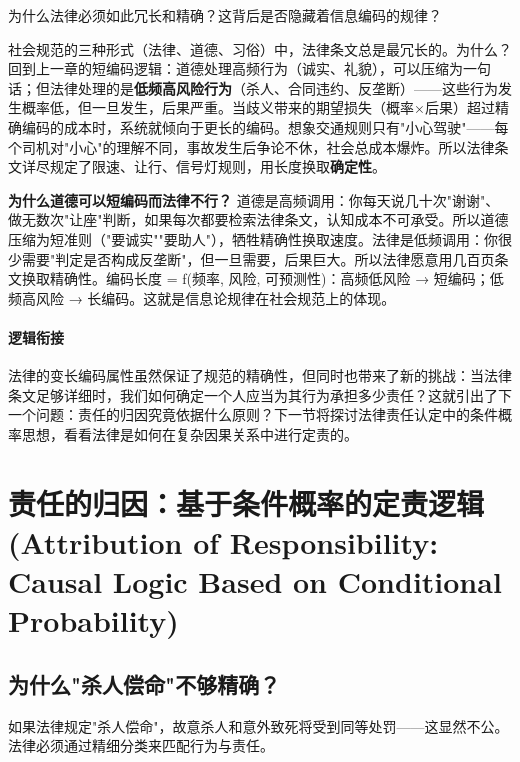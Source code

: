 \documentclass[../main.tex]{subfiles}
\begin{document}
	\begin{questionbox}

		为什么法律必须如此冗长和精确？这背后是否隐藏着信息编码的规律？

	\end{questionbox}
	
	社会规范的三种形式（法律、道德、习俗）中，法律条文总是最冗长的。为什么？回到上一章的短编码逻辑：道德处理高频行为（诚实、礼貌），可以压缩为一句话；但法律处理的是\textbf{低频高风险行为}（杀人、合同违约、反垄断）——这些行为发生概率低，但一旦发生，后果严重。当歧义带来的期望损失（概率×后果）超过精确编码的成本时，系统就倾向于更长的编码。想象交通规则只有"小心驾驶"——每个司机对"小心"的理解不同，事故发生后争论不休，社会总成本爆炸。所以法律条文详尽规定了限速、让行、信号灯规则，用长度换取\textbf{确定性}。
	
	\textbf{为什么道德可以短编码而法律不行？} 道德是高频调用：你每天说几十次"谢谢"、做无数次"让座"判断，如果每次都要检索法律条文，认知成本不可承受。所以道德压缩为短准则（"要诚实""要助人"），牺牲精确性换取速度。法律是低频调用：你很少需要"判定是否构成反垄断"，但一旦需要，后果巨大。所以法律愿意用几百页条文换取精确性。编码长度 = f(频率, 风险, 可预测性)：高频低风险 → 短编码；低频高风险 → 长编码。这就是信息论规律在社会规范上的体现。
	
	\paragraph*{逻辑衔接}

	法律的变长编码属性虽然保证了规范的精确性，但同时也带来了新的挑战：当法律条文足够详细时，我们如何确定一个人应当为其行为承担多少责任？这就引出了下一个问题：责任的归因究竟依据什么原则？下一节将探讨法律责任认定中的条件概率思想，看看法律是如何在复杂因果关系中进行定责的。

	\section{责任的归因：基于条件概率的定责逻辑 (Attribution of Responsibility: Causal Logic Based on Conditional Probability)}

	\subsection{为什么"杀人偿命"不够精确？}

	\begin{motivation}

		如果法律规定"杀人偿命"，故意杀人和意外致死将受到同等处罚——这显然不公。法律必须通过精细分类来匹配行为与责任。

	\end{motivation}
	
\end{document}
